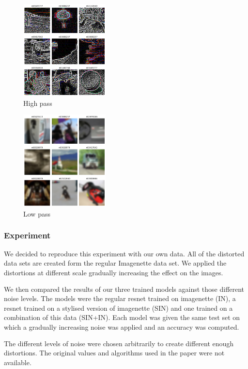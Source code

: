 \documentclass{article}
\begin{document}
\begin{figure}[h!]
\centering
\includegraphics[width = 0.4\textwidth]{imgs/image_high}
\caption{High pass}
\end{figure}

\begin{figure}[h!]
\centering
\includegraphics[width = 0.4\textwidth]{imgs/image_low}
\caption{Low pass}
\end{figure}

\subsubsection{Experiment}

We decided to reproduce this experiment with our own data.
All of the distorted data sets are created form the regular Imagenette data set. We applied the distortions at different scale gradually increasing the effect on the images.

We then compared the results of our three trained models against those different noise levels.
The models were the regular resnet trained on imagenette (IN), a resnet trained on a stylised version of imagenette (SIN) and one trained on a combination of this data (SIN+IN).
Each model was given the same test set on which a gradually increasing noise was applied and an accuracy was computed.

The different levels of noise were chosen arbitrarily to create different enough distortions. The original values and algorithms used in the paper were not available.
\end{document}
